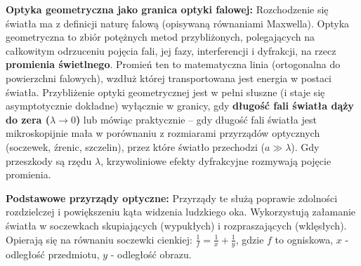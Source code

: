 \documentclass[11pt, a4paper]{article}
\begin{document}
\textbf{Optyka geometryczna jako granica optyki falowej:}
Rozchodzenie się światła ma z definicji naturę falową (opisywaną równaniami Maxwella). Optyka geometryczna to zbiór potężnych metod przybliżonych, polegających na całkowitym odrzuceniu pojęcia fali, jej fazy, interferencji i dyfrakcji, na rzecz \textbf{promienia świetlnego}. Promień ten to matematyczna linia (ortogonalna do powierzchni falowych), wzdłuż której transportowana jest energia w postaci światła. 
Przybliżenie optyki geometrycznej jest w pełni słuszne (i staje się asymptotycznie dokładne) wyłącznie w granicy, gdy \textbf{długość fali światła dąży do zera ($\lambda \to 0$)} lub mówiąc praktycznie – gdy długość fali światła jest mikroskopijnie mała w porównaniu z rozmiarami przyrządów optycznych (soczewek, źrenic, szczelin), przez które światło przechodzi ($a \gg \lambda$). Gdy przeszkody są rzędu $\lambda$, krzywoliniowe efekty dyfrakcyjne rozmywają pojęcie promienia.

\textbf{Podstawowe przyrządy optyczne:}
Przyrządy te służą poprawie zdolności rozdzielczej i powiększeniu kąta widzenia ludzkiego oka. Wykorzystują załamanie światła w soczewkach skupiających (wypukłych) i rozpraszających (wklęsłych). Opierają się na równaniu soczewki cienkiej: $\frac{1}{f} = \frac{1}{x} + \frac{1}{y}$, gdzie $f$ to ogniskowa, $x$ - odległość przedmiotu, $y$ - odległość obrazu.
\end{document}
